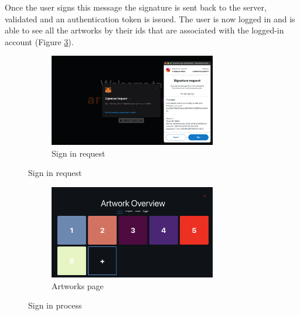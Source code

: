 Once the user signs this message the signature is sent back to the server, validated and an authentication token is issued. The user is now logged in and is able to see all the artworks by their \glspl{id} that are associated with the logged-in account (Figure \ref{fig:artworks_page}).

\begin{figure}[h!]
    \ContinuedFloat
    \begin{subfigure}{\textwidth}
        \centering
        \includegraphics[width=0.8\textwidth]{resources/frontend_screenshots/sign_in.png}
        \caption{Sign in request}
        \label{fig:sign_in}
        \vspace*{2mm}
    \end{subfigure}
\end{figure}

\begin{figure}[h]
    \ContinuedFloat
    \centering
    \begin{subfigure}{\textwidth}
        \centering
        \includegraphics[width=0.8\textwidth]{resources/frontend_screenshots/artworks_page.png}
        \caption{Artworks page}
        \label{fig:artworks_page}
    \end{subfigure}
    \caption{Sign in process}
    \label{fig:sign_in_process}
\end{figure}


